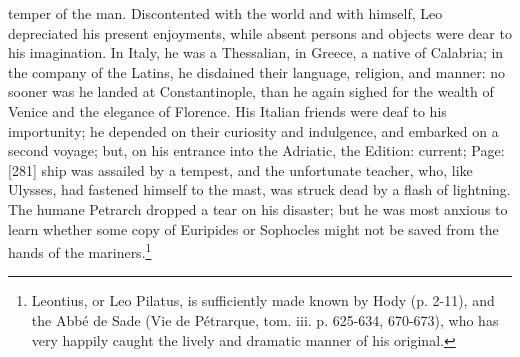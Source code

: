 temper of the man. Discontented with the world and with himself, Leo depreciated his present enjoyments, while absent persons and objects were dear to his imagination. In Italy, he was a Thessalian, in Greece, a native of Calabria; in the company of the Latins, he disdained their language, religion, and manner: no sooner was he landed at Constantinople, than he again sighed for the wealth of Venice and the elegance of Florence. His Italian friends were deaf to his importunity; he depended on their curiosity and indulgence, and embarked on a second voyage; but, on his entrance into the Adriatic, the Edition: current; Page: [281] ship was assailed by a tempest, and the unfortunate teacher, who, like Ulysses, had fastened himself to the mast, was struck dead by a flash of lightning. The humane Petrarch dropped a tear on his disaster; but he was most anxious to learn whether some copy of Euripides or Sophocles might not be saved from the hands of the mariners.\footnote{Leontius, or Leo Pilatus, is sufficiently made known by Hody (p. 2-11), and the Abbé de Sade (Vie de Pétrarque, tom. iii. p. 625-634, 670-673), who has very happily caught the lively and dramatic manner of his original.}

